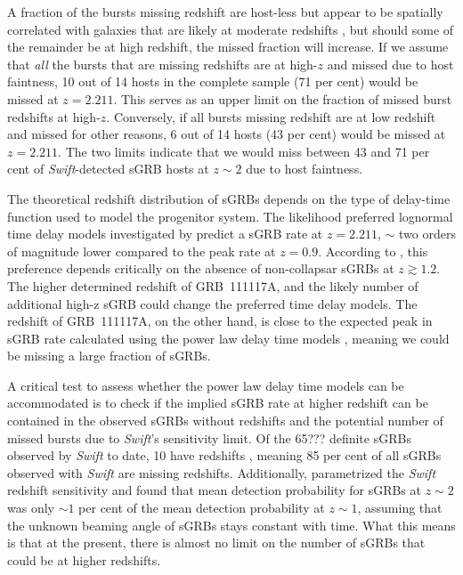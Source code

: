 \documentclass{aa}    %
\begin{document}
A fraction of the bursts missing redshift are host-less but appear to be
spatially correlated with galaxies that are likely at moderate redshifts
\citep{Tunnicliffe2014}, but should some of the remainder be at high redshift,
the missed fraction will increase. If we assume that \textit{all} the bursts
that are missing redshifts are at high-$z$ and missed due to host faintness, 10
out of 14 hosts in the complete sample (71 per cent) would be missed at $z =
2.211$. This serves as an upper limit on the fraction of missed burst redshifts
at high-$z$. Conversely, if all bursts missing redshift are at low redshift and
missed for other reasons, 6 out of 14 hosts (43 per cent) would be missed at $z
= 2.211$. The two limits indicate that we would miss between 43 and 71 per cent
of \textit{Swift}-detected sGRB hosts at $z \sim 2$ due to host faintness.

The theoretical redshift distribution of sGRBs depends on the type of delay-time
function used to model the progenitor system. The likelihood preferred lognormal
time delay models investigated by \citet{Wanderman2015} predict a sGRB rate at
$z = 2.211$, $\sim$ two orders of magnitude lower compared to the peak rate at
$z = 0.9$. According to \citet{Wanderman2015}, this preference depends
critically on the absence of non-collapsar sGRBs at $z \gtrsim 1.2$. The higher
determined redshift of GRB~111117A, and the likely number of additional high-z
sGRB could change the preferred time delay models. The redshift of GRB~111117A,
on the other hand, is close to the expected peak in sGRB rate calculated using
the power law delay time models \citep{Behroozi2014, Wanderman2015,
	Ghirlanda2016}, meaning we could be missing a large fraction of sGRBs.

A critical test to assess whether the power law delay time models can be
accommodated is to check if the implied sGRB rate at higher redshift can be
contained in the observed sGRBs without redshifts and the potential number of
missed bursts due to \textit{Swift}'s sensitivity limit. Of the 65??? definite
sGRBs observed by \textit{Swift} to date, 10 have redshifts \citep{GRBOX},
meaning 85 per cent of all sGRBs observed with \textit{Swift} are missing
redshifts. Additionally, \citet{Behroozi2014} parametrized the \textit{Swift}
redshift sensitivity and found that mean detection probability for sGRBs at $z
\sim2$ was only $\sim1$ per cent of the mean detection probability at $z \sim1$,
assuming that the unknown beaming angle of sGRBs stays constant with time. What
this means is that at the present, there is almost no limit on the number of
sGRBs that could be at higher redshifts.
\end{document}

